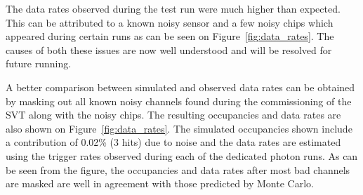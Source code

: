 The data rates observed during the test run were
much higher than expected.  This can be attributed to a known
noisy sensor and a few noisy chips which appeared during certain runs as can be seen
on Figure~\ref{fig:data_rates}.  The causes
of both these issues are now well understood and will be resolved for future running.

%

A better comparison between simulated and observed data rates can be obtained
by masking out all known noisy channels found during the commissioning of the 
SVT along with the noisy chips.  The resulting occupancies and data rates are also shown on 
Figure~\ref{fig:data_rates}. The simulated occupancies shown include a contribution
of 0.02\% (3 hits) due to noise and the data rates are estimated using the trigger
rates observed during each of the dedicated photon runs.  As can be seen from the
figure, the occupancies and data rates after most bad channels are masked are well
in agreement with those predicted by Monte Carlo.
